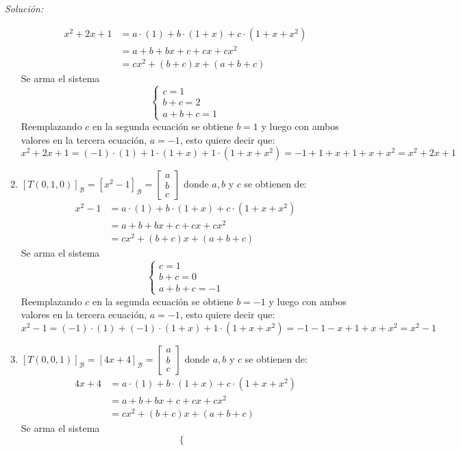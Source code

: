 \documentclass{article}
\newenvironment{solution}
    {\textit{Solución:}}
    {}
\begin{document}
\begin{solution}
\begin{enumerate}
\begin{align*}
x^2+2x+1 &= a \cdot (1) + b\cdot (1+x) + c \cdot (1+x+x^2) \\
&= a + b + bx + c + cx + cx^2 \\
&= cx^2 + (b+c)x+(a+b+c) 
\end{align*}
Se arma el sistema
\[
\begin{cases}
c = 1 \\
b+c = 2 \\
a+b+c = 1
\end{cases}
\]
Reemplazando $c$ en la segunda ecuación se obtiene $b=1$ y luego con ambos valores en la tercera ecuación, $a = -1$, esto quiere decir que:
\[
x^2+2x+1 = (-1) \cdot (1) + 1\cdot (1+x) + 1 \cdot (1+x+x^2) = -1+1+x+1+x+x^2 = x^2+2x+1
\]
\item 
$[T(0,1,0)]_{\mathcal{B}} = [x^2-1]_{\mathcal{B}} = \begin{bmatrix} a \\ b \\c \end{bmatrix}$ donde $a,b$ y $c$ se obtienen de:
\begin{align*}
x^2-1 &= a \cdot (1) + b\cdot (1+x) + c \cdot (1+x+x^2) \\
&= a + b + bx + c + cx + cx^2 \\
&= cx^2 + (b+c)x+(a+b+c) 
\end{align*}
Se arma el sistema
\[
\begin{cases}
c = 1 \\
b+c = 0 \\
a+b+c = -1
\end{cases}
\]
Reemplazando $c$ en la segunda ecuación se obtiene $b=-1$ y luego con ambos valores en la tercera ecuación, $a = -1$, esto quiere decir que:
\[
x^2-1 = (-1) \cdot (1) + (-1)\cdot (1+x) + 1 \cdot (1+x+x^2) = -1 -1 - x + 1 + x + x^2 = x^2-1
\]
\item 
$[T(0,0,1)]_{\mathcal{B}} = [4x+4]_{\mathcal{B}} = \begin{bmatrix} a \\ b \\c \end{bmatrix}$ donde $a,b$ y $c$ se obtienen de:
\begin{align*}
4x+4 &= a \cdot (1) + b\cdot (1+x) + c \cdot (1+x+x^2) \\
&= a + b + bx + c + cx + cx^2 \\
&= cx^2 + (b+c)x+(a+b+c) 
\end{align*}
Se arma el sistema
\[
\begin{cases}

\end{cases}\]
\end{enumerate}
\end{solution}
\end{document}
